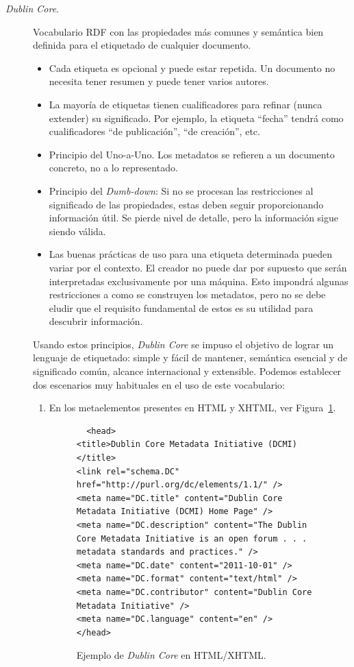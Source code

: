 \begin{description}
\item[\textit{Dublin Core}.] Vocabulario RDF con las propiedades más comunes y semántica bien definida para el etiquetado de cualquier documento.

\begin{itemize}
  \item Cada etiqueta es opcional y puede estar repetida. Un documento no
  necesita tener resumen y puede tener varios autores.
  \item La mayoría de etiquetas tienen cualificadores para refinar (nunca extender) su significado.
Por ejemplo, la etiqueta ``fecha'' tendrá como cualificadores ``de publicación'',
``de creación'', etc.
\item Principio del Uno-a-Uno. Los metadatos se refieren a un documento
concreto, no a lo representado. 
\item  Principio del \textit{Dumb-down}: Si no se procesan las restricciones al
significado de las propiedades, estas deben seguir proporcionando información
útil. Se pierde nivel de detalle, pero la información sigue siendo válida.
\item Las buenas prácticas de uso para una etiqueta determinada pueden variar por
el contexto. El creador no puede dar por supuesto que serán interpretadas exclusivamente por
una máquina. Esto impondrá algunas restricciones a como se construyen los
metadatos, pero no se debe eludir que el requisito fundamental de
estos es su utilidad para descubrir información.
\end{itemize}

Usando estos principios, \textit{Dublin Core} se impuso el objetivo de lograr un lenguaje
de etiquetado: simple y fácil de mantener, semántica esencial y de significado común, alcance internacional y extensible.
Podemos establecer dos escenarios muy habituales en el uso de este vocabulario:
\begin{enumerate}
  \item En los metaelementos presentes en \gls{HTML} y \gls{XHTML}, ver Figura~\ref{fig:html-dc-example}.

\begin{figure}[!htbp]
\centering
  \begin{lstlisting} 
  <head>
<title>Dublin Core Metadata Initiative (DCMI)</title>
<link rel="schema.DC" href="http://purl.org/dc/elements/1.1/" />
<meta name="DC.title" content="Dublin Core Metadata Initiative (DCMI) Home Page" />
<meta name="DC.description" content="The Dublin Core Metadata Initiative is an open forum . . . metadata standards and practices." />
<meta name="DC.date" content="2011-10-01" />
<meta name="DC.format" content="text/html" />
<meta name="DC.contributor" content="Dublin Core Metadata Initiative" />
<meta name="DC.language" content="en" />
</head>  
 \end{lstlisting} 
\label{fig:html-dc-example}
\caption{Ejemplo de \textit{Dublin Core} en HTML/XHTML.}
\end{figure}
 

\end{enumerate}
\end{description}
